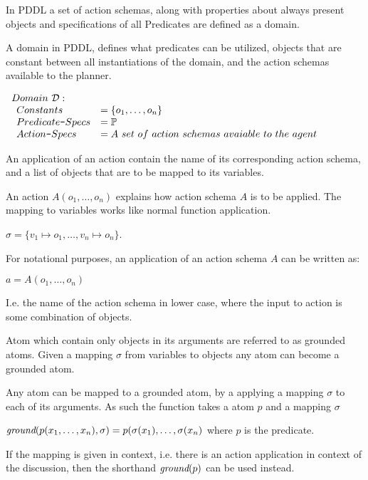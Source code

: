 \documentclass[../Master.tex]{subfiles}
\begin{document}
In PDDL a set of action schemas, along with properties about always present objects and specifications of all Predicates are defined as a domain.

\begin{definition} A domain in PDDL, defines what predicates can be utilized, objects that are constant between all instantiations of the domain, and the action schemas available to the planner.
	
$
\begin{array}{ll}
Domain~\mathcal{D}: & \\

\begin{array}{ll}
Constants & = \{o_1,\dots,o_n\}			 \\  
Predicate\texttt{-}Specs &= \preds \\
Action\texttt{-}Specs & = A~set~of~action~schemas~avaiable~to~the~agent \\
\end{array}
\end{array}$
\end{definition}


	

An application of an action contain the name of its corresponding action schema, and a list of objects that are to be mapped to its variables.
\begin{definition} 
	An action $A(o_1,\dots,o_n)$ explains how action schema $A$ is to be applied. The mapping to variables works like normal function application. 
	
	$\sigma = \{ v_1 \mapsto o_1,\dots,v_n \mapsto o_n \}$.
	
	For notational purposes, an application of an action schema $A$ can be written as:
	
	$a = A(o_1,\dots,o_n)$ 
	
	I.e. the name of the action schema in lower case, where the input to action is some combination of objects.
	
	
	
\end{definition}


Atom which contain only objects in its arguments are referred to as grounded atoms. Given a mapping $\sigma$ from variables to objects any atom can become a grounded atom.
\begin{definition}\label{def:pddl:ground-func}
	Any atom can be mapped to a grounded atom, by a applying a mapping $\sigma$ to each of its arguments. As such the \ground function takes a atom $p$ and a mapping $\sigma$
	
		$\textit{ground}(p(x_1,\dots,x_n),\sigma) = p(\sigma(x_1),\dots,\sigma(x_n)$ where $p$ is the predicate.
		
	If the mapping is given in context, i.e. there is an action application in context of the discussion, then the shorthand $\textit{ground}(p)$ can be used instead.
\end{definition}
\end{document}
